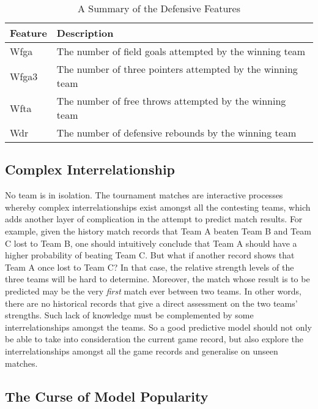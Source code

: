 \begin{table}[h!]
\centering
\begin{tabular}{ | l | l | }
\hline
\textbf{Feature} & \textbf{Description} \\ \hline
Wfga & The number of field goals attempted by the winning team \\ \hline
Wfga3 & The number of three pointers attempted by the winning team\\ \hline
Wfta & The number of free throws attempted by the winning team\\ \hline
Wdr & The number of defensive rebounds by the winning team \\ \hline
\end{tabular}
\caption{A Summary of the Defensive Features}\label{Ta:defensive_feature}
\end{table}

\subsection{Complex Interrelationship}

No team is in isolation. The tournament matches are interactive processes whereby complex interrelationships exist amongst all the contesting teams, which adds another layer of complication in the attempt to predict match results. For example, given the history match records that Team A beaten Team B and Team C lost to Team B, one should intuitively conclude that Team A should have a higher probability of beating Team C. But what if another record shows that Team A once lost to Team C? In that case, the relative strength levels of the three teams will be hard to determine. Moreover, the match whose result is to be predicted may be the very \emph{first} match ever between two teams. In other words, there are no historical records that give a direct assessment on the two teams' strengths. Such lack of knowledge must be complemented by some interrelationships amongst the teams. So a good predictive model should not only be able to take into consideration the current game record, but also explore the interrelationships amongst all the game records and generalise on unseen matches. 

\subsection{The Curse of Model Popularity}

